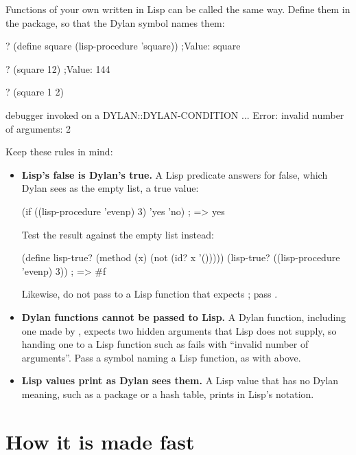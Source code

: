 \noindent
Functions of your own written in Lisp can be called the same way. Define
them in the  package, so that the Dylan symbol names them:


\begin{repl}
? (define square (lisp-procedure 'square))
;Value: square

? (square 12)
;Value: 144

? (square 1 2)

debugger invoked on a DYLAN::DYLAN-CONDITION ...
  Error: invalid number of arguments: 2
\end{repl}

\noindent
Keep these rules in mind:

\begin{itemize}
\item \textbf{Lisp's false is Dylan's true.} A Lisp predicate answers
  \code{NIL} for false, which Dylan sees as the empty list, a true
  value:
\begin{dylan}
(if ((lisp-procedure 'evenp) 3) 'yes 'no)    ; => yes
\end{dylan}
  Test the result against the empty list instead:
\begin{dylan}
(define lisp-true? (method (x) (not (id? x '()))))
(lisp-true? ((lisp-procedure 'evenp) 3))      ; => #f
\end{dylan}
  Likewise, do not pass  to a Lisp function that expects
  \code{NIL}; pass \code{'()}.
\item \textbf{Dylan functions cannot be passed to Lisp.} A Dylan
  function, including one made by \code{lisp-procedure}, expects two
  hidden arguments that Lisp does not supply, so handing one to a Lisp
  function such as \code{mapcar} fails with ``invalid number of
  arguments''. Pass a symbol naming a Lisp function, as with 
  above.
\item \textbf{Lisp values print as Dylan sees them.} A Lisp value that
  has no Dylan meaning, such as a package or a hash table, prints in
  Lisp's notation.
\end{itemize}

\section{How it is made fast}\label{sec:lisp-performance}

